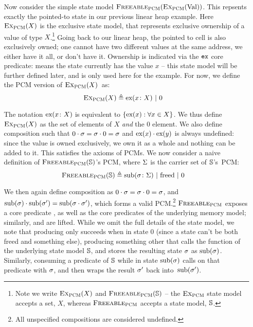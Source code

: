 Now consider the simple state model $\textsc{Freeable}_{\textsc{PCM}}(\textsc{Ex}_{\textsc{PCM}}(\text{Val}))$. This repsents exactly the pointed-to state in our previous linear heap example. Here $\textsc{Ex}_{\textsc{PCM}}(X)$ is the exclusive state model, that represents exclusive ownership of a value of type $X$.\footnote{Note we write $\textsc{Ex}_{\textsc{PCM}}(X)$ and $\textsc{Freeable}_{\textsc{PCM}}(\mathbb S)$ -- the $\textsc{Ex}_{\textsc{PCM}}$ state model accepts a set, $X$, whereas $\textsc{Freeable}_{\textsc{PCM}}$ accepts a state model, $\mathbb S$.} Going back to our linear heap, the pointed to cell is also exclusively owned; one cannot have two different values at the same address, we either have it all, or don't have it. Ownership is indicated via the $\texttt{ex}$ core predicate:  means the state currently has the value $x$ -- this state model will be further defined later, and is only used here for the example. For now, we define the PCM version of $\textsc{Ex}_{\textsc{PCM}}(X)$~as:
\begin{align*}
	\textsc{Ex}_{\textsc{PCM}}(X) &\triangleq \text{ex}(x\colon X) ~|~ 0
\end{align*}

The notation $\text{ex}(x\colon X)$ is equivalent to $\{ \text{ex}(x) : \forall x\in X \}$. We thus define $\textsc{Ex}_{\textsc{PCM}}(X)$ as the set of elements of $X$ \emph{and} the $0$ element. We also define composition such that $0\cdot \sigma=\sigma\cdot 0=\sigma$ and $\text{ex}(x) \cdot \text{ex}(y)$ is always undefined: since the value is owned exclusively, we own it as a whole and nothing can be added to it. This satisfies the axioms of PCMs. We now consider a naive definition of $\textsc{Freeable}_{\textsc{PCM}}(\mathbb S)$'s PCM, where $\Sigma$ is the carrier set of $\mathbb S$'s~PCM:
\begin{align*}
	\textsc{Freeable}_{\textsc{PCM}}(\mathbb S) &\triangleq \text{sub}(\sigma\colon \Sigma) ~|~ \text{freed} ~|~ 0
\end{align*}

We then again define composition as $0 \cdot \sigma=\sigma \cdot 0=\sigma$, and $\text{sub}(\sigma) \cdot \text{sub}(\sigma')=\text{sub}(\sigma\cdot \sigma')$, which forms a valid PCM.\footnote{All unspecified compositions are considered undefined.} $\textsc{Freeable}_{\textsc{PCM}}$ exposes a core predicate \freedP, as well as the core predicates of the underlying memory model; similarly, \consume{} and \produce{} are lifted. While we omit the full details of the state model, we note that producing \freedP{} only succeeds when in state $0$ (since a state can't be both freed and something else), producing something other that \freedP{} calls the \produce{} function of the underlying state model $\mathbb S$, and stores the resulting state $\sigma$ as $\text{sub}(\sigma)$. Similarly, consuming a predicate of $\mathbb S$ while in state $\text{sub}(\sigma)$ calls \consume{} on that predicate with $\sigma$, and then wraps the result $\sigma'$ back into~$\text{sub}(\sigma')$.

